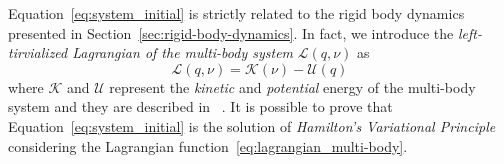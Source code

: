 Equation~\eqref{eq:system_initial} is strictly related to the rigid body dynamics presented in Section~\ref{sec:rigid-body-dynamics}. In fact, we introduce the \emph{left-tirvialized Lagrangian of the multi-body system} $\mathcal{L}(q,\nu)$ as 
\begin{equation}
    \label{eq:lagrangian_multi-body}
    \mathcal{L}(q,\nu) = \mathcal{K}(\nu) - \mathcal{U}(q)
\end{equation}
where $\mathcal{K}$ and $\mathcal{U}$ represent the \emph{kinetic} and \emph{potential} energy of the multi-body system and they are described in ~\cite[Section~3.5]{Traversaro2017ModellingDynamics}.
It is possible to prove that Equation~\eqref{eq:system_initial} is the solution of \emph{Hamilton's Variational Principle} considering the Lagrangian function~\eqref{eq:lagrangian_multi-body}.


